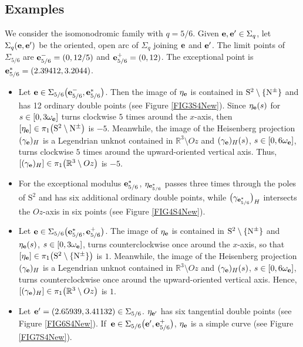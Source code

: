 \documentclass[10pt,a4paper]{amsart}
\def\rS{{\mathrm S}}
\def\gam{\gamma} %
\def\R{\mathbb R}
\newcommand\be{{\bf e}}
\numberwithin{equation}{section}
\begin{document}
\subsection*{Examples} We consider the isomonodromic family with $q=5/6$.
Given $\be,\be'\in \Sigma_q$, let $ \Sigma_q(\be,\be')$ be the oriented, open arc of $\Sigma_q$ joining $\be$ and $\be'$. The limit points of $\Sigma_{5/6}$ are $\be^-_{5/6}=(0,12/5)$ and $\be^+_{5/6}=(0,12)$. The exceptional point is $\be_{5/6}^*=(2.39412,3.2044)$.
\begin{itemize}\itemsep=0pt
\item Let $\be\in \Sigma_{5/6}\bigl(\be^-_{5/6},\be^*_{5/6}\bigr)$. Then the image of $\eta_{\be}$ is contained in $ \rS^2\setminus \{{\rm N}^{\pm}\}$ and has 12 ordinary double points (see Figure \ref{FIG3S4New}). Since $\eta_{\be}(s)$ for $s\in [0,3\omega_{\be}]$ turns clockwise $5$ times around the $x$-axis, then $[\eta_{\be}]\in \pi_1\bigl(\rS^2\setminus {\rm N}^{\pm}\bigr)$ is $-5$. Meanwhile, the image of the Heisenberg projection $(\gam_{\be})_H$ is a Legendrian unknot contained in $\R^3\setminus Oz$ and $(\gam_{\be})_H(s)$, $s\in [0,6\omega_{\be}]$, turns clockwise $5$ times around the upward-oriented vertical axis. Thus, $[(\gam_{\be})_H]\in \pi_1\bigl(\R^3\setminus Oz\bigr)$ is $-5$.

\item For the exceptional modulus $\be^*_{5/6}$, $\eta_{\be^*_{5/6}}$ passes three times through the poles of $\rS^2$ and has six additional ordinary double points, while
$\bigl(\gam_{\be^*_{5/6}}\bigr)_H$ intersects the $Oz$-axis in six points (see Figure \ref{FIG4S4New}).

\item Let $\be\in \Sigma_{5/6}\bigl(\be^*_{5/6},\be^+_{5/6}\bigr)$. The image of
$\eta_{\be}$ is contained in $\rS^2\setminus \{{\rm N}^{\pm}\}$ and $\eta_{\be}(s)$, $s\in [0,3\omega_{\be}]$, turns counterclockwise once around the $x$-axis, so that $[\eta_{\be}]\in \pi_1\bigl(\rS^2\setminus \{{\rm N}^{\pm}\}\bigr)$ is $1$.
Meanwhile, the image of the Heisenberg projection $(\gam_{\be})_H$ is a Legendrian unknot
contained in $\R^3\setminus Oz$ and $(\gam_{\be})_H(s)$, $s\in [0,6\omega_{\be}]$, turns counterclockwise once around the upward-oriented vertical axis. Hence, $[(\gam_{\be})_H]\in \pi_1\bigl(\R^3\setminus Oz\bigr)$ is $1$.

\item
Let $\be'=(2.65939, 3.41132)\in \Sigma_{5/6}$. $\eta_{\be'}$ has six tangential double points (see Figure \ref{FIG6S4New}).
 If~$\be\in \Sigma_{5/6}\bigl(\be',\be^+_{5/6}\bigr)$, $\eta_\be$ is a simple curve (see Figure \ref{FIG7S4New}).


\end{itemize}
\end{document}

